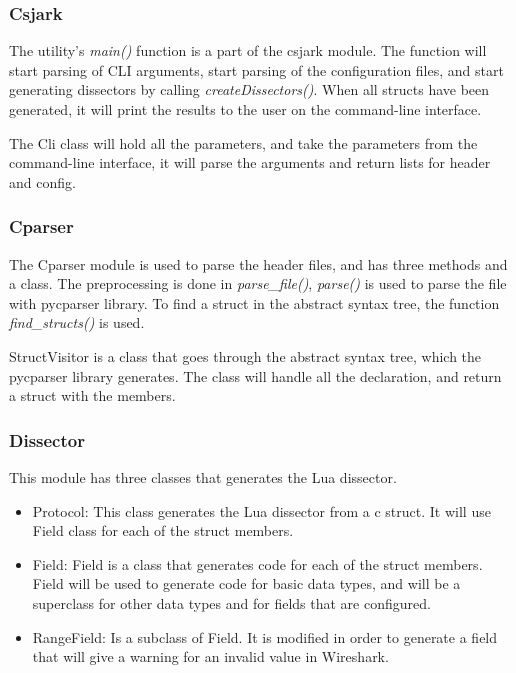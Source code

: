 \subsubsection{Csjark}
The utility's \emph{main()} function is a part of the csjark module. The function will start parsing of CLI arguments, start parsing of the configuration files, and start generating dissectors by calling \emph{createDissectors()}. When all structs have been generated, it will print the results to the user on the command-line interface.

The Cli class will hold all the parameters, and take the parameters from the command-line interface, it will parse the arguments and return lists for header and config.

\subsubsection{Cparser}
The Cparser module is used to parse the header files, and has three methods and a class. The preprocessing is done in \emph{parse\_file()}, \emph{parse()} is used to parse the file with pycparser library. To find a struct in the abstract syntax tree, the function \emph{find\_structs()} is used.

StructVisitor is a class that goes through the abstract syntax tree, which the pycparser library generates. The class will handle all the declaration, and return a struct with the members.

\subsubsection{Dissector}
This module has three classes that generates the Lua dissector.

\begin{itemize}
	\item Protocol: This class generates the Lua dissector from a \Gls{c} struct. It will use Field class for each of the struct members.
	\item Field: Field is a class that generates code for each of the struct members. Field will be used to generate code for basic data types, and will be a superclass for other data types and for fields that are configured.
	\item RangeField: Is a subclass of Field. It is modified in order to generate a field that will give a warning for an invalid value in Wireshark.
\end{itemize}

